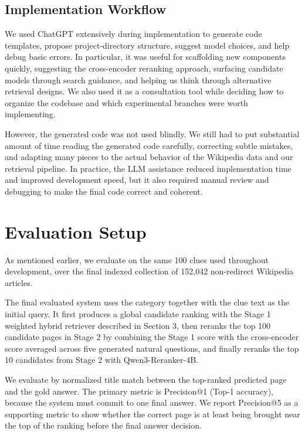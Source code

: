 \documentclass[11pt]{article}
\begin{document}
\subsection{Implementation Workflow}

We used ChatGPT extensively during implementation to generate code templates, propose project-directory structure, suggest model choices, and help debug basic errors. In particular, it was useful for scaffolding new components quickly, suggesting the cross-encoder reranking approach, surfacing candidate models through search guidance, and helping us think through alternative retrieval designs. We also used it as a consultation tool while deciding how to organize the codebase and which experimental branches were worth implementing.

However, the generated code was not used blindly. We still had to put substantial amount of time reading the generated code carefully, correcting subtle mistakes, and adapting many pieces to the actual behavior of the Wikipedia data and our retrieval pipeline. 
In practice, the LLM assistance reduced implementation time and improved development speed, but it also required manual review and debugging to make the final code correct and coherent.

\section{Evaluation Setup}

As mentioned earlier, we evaluate on the same 100 clues used throughout development, over the final indexed collection of 152,042 non-redirect Wikipedia articles.

The final evaluated system uses the category together with the clue text as the initial query. It first produces a global candidate ranking with the Stage 1 weighted hybrid retriever described in Section 3, then reranks the top 100 candidate pages in Stage 2 by combining the Stage 1 score with the cross-encoder score averaged across five generated natural questions, and finally reranks the top 10 candidates from Stage 2 with Qwen3-Reranker-4B.

We evaluate by normalized title match between the top-ranked predicted page and the gold answer. The primary metric is Precision@1 (Top-1 accuracy), because the system must commit to one final answer. We report Precision@5 as a supporting metric to show whether the correct page is at least being brought near the top of the ranking before the final answer decision.
\end{document}
